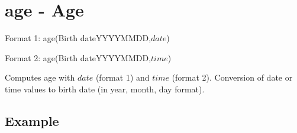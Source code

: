 
%

\section{age - Age\label{sect:age}}

Format 1: age(Birth dateYYYYMMDD,$date$)

Format 2: age(Birth dateYYYYMMDD,$time$)

Computes age with $date$ (format 1) and $time$ (format 2). Conversion of date or time values to birth date (in year, month, day format). 


\subsection*{Example}


%

